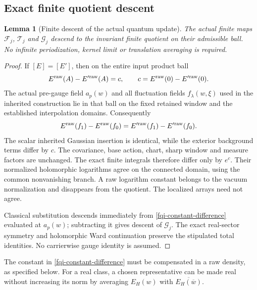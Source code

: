 \documentclass[11pt]{article}
\newtheorem{lemma}[theorem]{Lemma}
\theoremstyle{remark}
\begin{document}
\subsection{Exact finite quotient descent}
\label{fqi-descent-section}

\begin{lemma}[Finite descent of the actual quantum update]
\label{fqi-descent-lemma}
The actual finite maps $\mathcal F_j$, $\mathcal T_j$ and
$\mathcal G_j$ descend to the invariant finite quotient on
their admissible ball. No infinite periodization, kernel limit
or translation averaging is required.
\end{lemma}
\begin{proof}
If $[E]=[E']$, then on the entire input product ball
\begin{equation}
 E^{\rm raw}(A)-E'^{\rm raw}(A)=c,
 \qquad c=E^{\rm raw}(0)-E'^{\rm raw}(0).
 \label{fqi-constant-difference}
\end{equation}
The actual pre-gauge field $a_p(w)$ and all fluctuation fields
$f_\lambda(w,\xi)$ used in the inherited construction lie in
that ball on the fixed retained window and the established
interpolation domains. Consequently
\begin{equation}
 E^{\rm raw}(f_1)-E^{\rm raw}(f_0)
       =E'^{\rm raw}(f_1)-E'^{\rm raw}(f_0).
 \label{fqi-same-insertion}
\end{equation}
The scalar inherited Gaussian insertion is identical, while
the exterior background terms differ by $c$. The covariance,
base action, chart, sharp window and measure factors are unchanged.
The exact finite integrals therefore differ only by $e^c$.
Their normalized holomorphic logarithms agree on the connected
domain, using the common nonvanishing branch. A raw logarithm
constant belongs to the vacuum normalization and disappears
from the quotient. The localized arrays need not agree.

Classical substitution descends immediately from
\eqref{fqi-constant-difference} evaluated at $a_p(w)$;
subtracting it gives descent of $\mathcal G_j$.
The exact real-sector symmetry and holomorphic Ward continuation
preserve the stipulated total identities. No carrierwise gauge
identity is assumed.
\end{proof}

The constant in \eqref{fqi-constant-difference} must be compensated
in a raw density, as specified below. For a real class, a chosen
representative can be made real without increasing its norm by
averaging $E_H(w)$ with $\overline{E_H(\overline w)}$.
\end{document}

